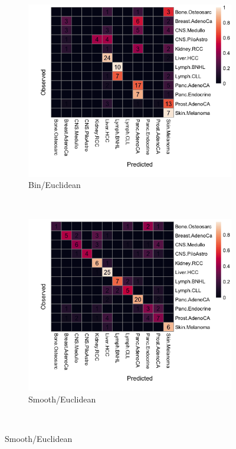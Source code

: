 \begin{figure}[ht!]
    \begin{subfigure}{.5\textwidth}
    \centering
    \includegraphics[width=\textwidth,height=0.9\textwidth]{graphics/confusion_matrix_bins_euclidean.png}
    \caption{Bin/Euclidean}
    \label{fig:confusion_bin_euclidean}
    \end{subfigure}
    ~
    \begin{subfigure}{.5\textwidth}
    \centering
    \includegraphics[width=\textwidth,height=0.9\textwidth]{graphics/confusion_matrix_smooth_euclidean.png}
    \caption{Smooth/Euclidean}
    \label{fig:confusion_smooth_euclidean}
    \end{subfigure} \\
    \vspace{0.5cm}
    

\end{figure}
